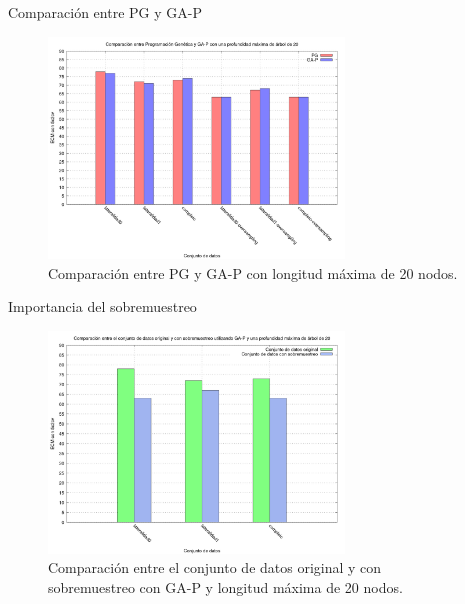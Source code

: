 \documentclass{beamer}
\begin{document}
\begin{frame}{Comparación entre PG y GA-P}

	\begin{figure}[H]
	    \centering
		  \includegraphics[width=0.7\textwidth]{comparacion_pg_gap_20.png}
		  \caption{Comparación entre PG y GA-P con longitud máxima de 20 nodos.}\label{fig:cmp_pg_gap_20}

	\end{figure}


\end{frame}


\begin{frame}{Importancia del sobremuestreo}

	\begin{figure}[H]
	    \centering
		  \includegraphics[width=0.7\textwidth]{comparacion_over_gap_20.png}
		  \caption{Comparación entre el conjunto de datos original y con sobremuestreo con GA-P y longitud máxima de 20 nodos.}\label{fig:cmp_gap_over_20}

	\end{figure}


\end{frame}
\end{document}
